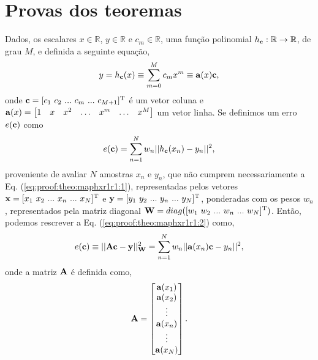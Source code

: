 \section{Provas dos teoremas}
 
\begin{myproofT}\label{proof:theo:maphxr1r1}
Dados,
os escalares $x \in \mathbb{R}$, $y \in \mathbb{R}$ e $c_m \in \mathbb{R}$,
uma função polinomial $h_{\VECTOR{c}}:\mathbb{R} \rightarrow \mathbb{R}$, de grau $M$, e 
definida a seguinte equação,
\begin{equation}\label{eq:proof:theo:maphxr1r1:1}
y=h_{\VECTOR{c}}(x)\equiv \sum_{m=0}^{M}c_m x^m\equiv \VECTOR{a}(x)\VECTOR{c},
\end{equation}
onde $\VECTOR{c}=[c_1~ c_2~ ...~ c_m~ ...~ c_{M+1}]^{\transpose}$ é um vetor coluna e
$\VECTOR{a}(x)=\begin{bmatrix} 
1& x& x^2& \hdots & x^m& \hdots& x^M
\end{bmatrix}$ um vetor linha.
Se definimos um erro $e(\VECTOR{c})$ como
\begin{equation}\label{eq:proof:theo:maphxr1r1:2}
e(\VECTOR{c}) =  \sum_{n=1}^{N} w_n||h_{\VECTOR{c}}(x_n)-y_n||^2,
\end{equation}
proveniente de avaliar $N$ amostras $x_n$ e $y_n$, 
que não cumprem necessariamente a Eq. (\ref{eq:proof:theo:maphxr1r1:1}), 
representadas pelos vetores $\VECTOR{x}=[x_1~ x_2~ ...~ x_n~ ...~ x_N]^{\transpose}$ e $\VECTOR{y}=[y_1~ y_2~ ...~ y_n~ ...~ y_N]^{\transpose}$,
ponderadas com os pesos $w_n$, representados pela matriz diagonal $\MATRIX{W}=\funcdiag([w_1~ w_2~ ...~ w_n~ ...~ w_N]^{\transpose})$.
Então, podemos rescrever a Eq. (\ref{eq:proof:theo:maphxr1r1:2}) como,
\begin{equation}\label{eq:proof:theo:maphxr1r1:3}
e(\VECTOR{c}) \equiv ||\MATRIX{A}\VECTOR{c}-\VECTOR{y}||_{\MATRIX{W}}^2 =  \sum_{n=1}^{N} w_n||\VECTOR{a}(x_n)\VECTOR{c}-y_n||^2,
\end{equation}
onde a matriz $\MATRIX{A}$ é definida como,
\begin{equation}\label{eq:proof:maphxr1r1:4}
\MATRIX{A}=\begin{bmatrix}
\VECTOR{a}(x_1)\\
\VECTOR{a}(x_2)\\
\vdots\\
\VECTOR{a}(x_n)\\
\vdots\\
\VECTOR{a}(x_N)\\
\end{bmatrix}.
\end{equation}



\end{myproofT}
